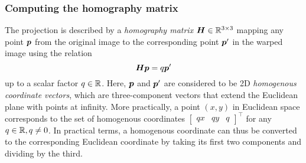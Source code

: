 \documentclass[../report.tex]{subfiles}
\begin{document}
\subsubsection{Computing the homography matrix}
\label{sec:homography_matrix}
The projection is described by a \emph{homography matrix} ${\bm{H}} \in \mathbb{R}^{3 \times 3}$ \cite{szeliski2011} mapping any point
${\bm{p}}$
from the original image to
the corresponding point
${\bm{p}}'$
in the warped image using the relation
\begin{equation}
    \label{eq:homography_matrix_relation}
    {\bm{H}}
    {\bm{p}}
    = q {\bm{p}}'
\end{equation}
up to a scalar factor $q \in \mathbb{R}$.
Here, ${\bm{p}}$ and ${\bm{p}}'$ are considered to be 2D \emph{homogenous coordinate vectors}, which are three-component vectors that extend the Euclidean plane with points at infinity. 
More practically, a point $(x,y)$ in Euclidean space corresponds to the set of homogenous coordinates
$\begin{bmatrix}
    q x & q y & q
\end{bmatrix}^\top$ for any $q \in \mathbb{R},q \neq 0$.
In practical terms, a homogenous coordinate can thus be converted to the corresponding Euclidean coordinate by taking its first two components and dividing by the third.
\end{document}

